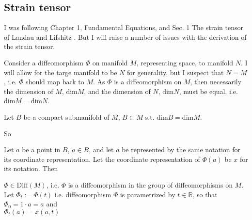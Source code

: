 \documentclass[twoside,landscape,10pt]{amsart}
\theoremstyle{plain}
\theoremstyle{definition}
\theoremstyle{remark}
\begin{document}
\begin{multicols*}{2}

\section{Strain tensor} I was following Chapter 1, Fundamental Equations, and Sec. 1 The strain tensor of Landau and Lifshitz \cite{LLandauELifshitz1970}.  But I will raise a number of issues with the derivation of the strain tensor.  

Consider a diffeomorphism $\Phi$ on manifold $M$, representing space, to manifold $N$.  I will allow for the targe manifold to be $N$ for generality, but I suspect that $N=M$, i.e. $\Phi$ should map back to $M$.  As $\Phi$ is a diffeomorphism on $M$, then necessarily the dimension of $M$, $\text{dim}M$, and the dimension of $N$, $\text{dim}N$, must be equal, i.e. $\text{dim}M = \text{dim}N$.  

Let $B$ be a compact submanifold of $M$, $B\subset M$ s.t. $\text{dim}B = \text{dim}M$.  

So 

Let $a$ be a point in $B$, $a\in B$, and let $a$ be represented by the same notation for its coordinate representation.  Let the coordinate representation of $\Phi(a)$ be $x$ for its notation.  Then


$\Phi \in \text{Diff}(M)$, i.e. $\Phi$ is a diffeomorphism in the group of diffeomorphisms on $M$.  \\
Let $\Phi_t:= \Phi(t)$ i.e. diffeomorphism $\Phi$ is parametrized by $t\in \mathbb{R}$, so that \\
\phantom{Let } $\Phi_0 = 1\cdot a = a$ and \\
\phantom{Let } $\Phi_t(a) = x(a,t)$



\end{multicols*}
\end{document}
